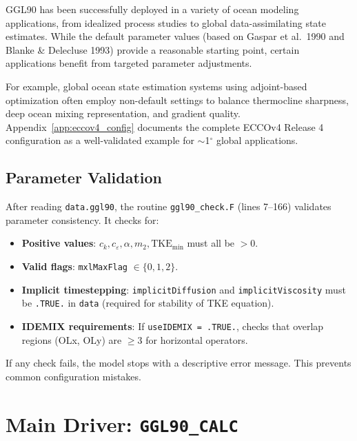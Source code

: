 \documentclass[12pt,letterpaper]{article}
\newcommand{\TKE}{\mathrm{TKE}}
\begin{document}
GGL90 has been successfully deployed in a variety of ocean modeling applications,
from idealized process studies to global data-assimilating state estimates. While
the default parameter values (based on Gaspar et al.\ 1990 and Blanke \& Delecluse
1993) provide a reasonable starting point, certain applications benefit from
targeted parameter adjustments.

For example, global ocean state estimation systems using adjoint-based
optimization often employ non-default settings to balance thermocline sharpness,
deep ocean mixing representation, and gradient quality. Appendix~\ref{app:eccov4_config}
documents the complete ECCOv4 Release 4 configuration as a well-validated
example for $\sim$1$^\circ$ global applications.

\subsection{Parameter Validation}

After reading \texttt{data.ggl90}, the routine \texttt{ggl90\_check.F} (lines
7--166) validates parameter consistency. It checks for:

\begin{itemize}[leftmargin=*]
  \item \textbf{Positive values}: $c_k, c_\varepsilon, \alpha, m_2, \TKE_{\mathrm{min}}$
        must all be $> 0$.
  \item \textbf{Valid flags}: \texttt{mxlMaxFlag} $\in \{0, 1, 2\}$.
  \item \textbf{Implicit timestepping}: \texttt{implicitDiffusion} and
        \texttt{implicitViscosity} must be \texttt{.TRUE.} in \texttt{data}
        (required for stability of TKE equation).
  \item \textbf{IDEMIX requirements}: If \texttt{useIDEMIX = .TRUE.}, checks
        that overlap regions (OLx, OLy) are $\geq 3$ for horizontal operators.
\end{itemize}

If any check fails, the model stops with a descriptive error message. This
prevents common configuration mistakes.

\section{Main Driver: \texttt{GGL90\_CALC}}
\label{sec:ggl90_calc}
\end{document}
